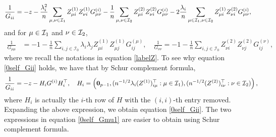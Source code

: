 \begin{align}
\frac{1}{{G_{ii} }}&=  - z - \frac{\lambda_i^2}{n} \sum_{\mu,\nu\in \mathcal I_1} Z^{(1)}_{\mu i}Z^{(1)}_{\nu i}G^{\left( i \right)}_{\mu\nu} - \frac{1}{n} \sum_{\mu,\nu\in \mathcal I_2} Z^{(2)}_{\mu i}Z^{(2)}_{\nu i}G^{\left( i \right)}_{\mu\nu} -2 \frac{\lambda_i}{n} \sum_{\mu\in \cal I_1,\nu\in \mathcal I_2} Z^{(1)}_{\mu i}Z^{(2)}_{\nu i}G^{\left( i \right)}_{\mu\nu} , \label{0self_Gii}
\end{align}
and for $\mu \in \cal I_1$ and $\nu\in \cal I_2$,
\begin{align}
\frac{1}{{G_{\mu\mu} }}&=  - 1 - \frac{1}{n} \sum_{i,j\in \mathcal I_0}\lambda_i \lambda_j Z^{(1)}_{\mu i}Z^{(1)}_{\mu j} G^{\left(\mu\right)}_{ij}, \quad \frac{1}{{G_{\nu\nu} }}=  - 1 - \frac{1}{n} \sum_{i,j\in \mathcal I_0}  Z^{(2)}_{\nu i}Z^{(2)}_{\nu j}  G^{\left(\nu\right)}_{ij},
\label{0self_Gmu1}
\end{align}
where we recall the notations in equation \eqref{labelZ}. To see why equation \eqref{0self_Gii} holds, we have that by Schur complement formula,
\begin{align*}
\frac{1}{G_{ii}}= -z - H_i G^{(i)}H_{i}^\top, \quad H_i = \left( \mathbf 0_{p-1}, (n^{-1/2}\lambda_i (Z^{(1)})^\top_{i\mu }:\mu \in \cal I_1),(n^{-1/2} (Z^{(2)})^\top_{i\nu }:\nu \in \cal I_2)\right),
\end{align*}
where $H_i$ is actually the $i$-th row of $H$ with the $(i,i)$-th entry removed. Expanding the above expression, we obtain equation \eqref{0self_Gii}. The two expressions in equation \eqref{0self_Gmu1} are easier to obtain using Schur complement formula.

